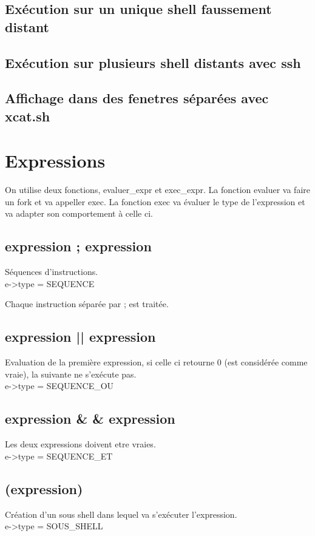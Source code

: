 \documentclass[12pt]{article}
\begin{document}
\subsection{Exécution sur un unique shell faussement distant}

\subsection{Exécution sur plusieurs shell distants avec ssh}

\subsection{Affichage dans des fenetres séparées avec xcat.sh}

\newpage
\section{Expressions}
On utilise deux fonctions, evaluer\_expr et exec\_expr.
La fonction evaluer va faire un fork et va appeller exec. La fonction exec va évaluer le type de l'expression et va adapter son comportement à celle ci.

\subsection{expression ; expression}
Séquences d'instructions.
\\
e->type = SEQUENCE

Chaque instruction séparée par ; est traitée.

\subsection{expression || expression}
Evaluation de la première expression, si celle ci retourne 0 (est considérée comme vraie), la suivante ne s'exécute pas.
\\
e->type = SEQUENCE\_OU

\subsection{expression \& \& expression}
Les deux expressions doivent etre vraies.
\\
e->type = SEQUENCE\_ET

\subsection{(expression)}
Création d'un sous shell dans lequel va s'exécuter l'expression.
\\
e->type = SOUS\_SHELL
\end{document}
